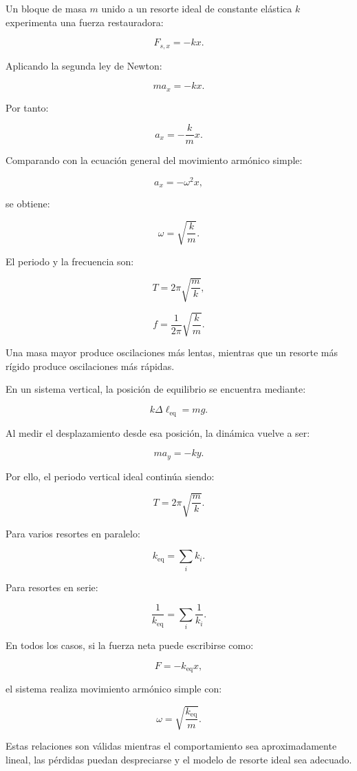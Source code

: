 \begin{resumen}
Un bloque de masa \(m\) unido a un resorte ideal de constante elástica \(k\) experimenta una fuerza restauradora:

\[ F_{s,x}=-kx. \]

Aplicando la segunda ley de Newton:

\[ ma_x=-kx. \]

Por tanto:

\[ \boxed{a_x=-\frac{k}{m}x}. \]

Comparando con la ecuación general del movimiento armónico simple:

\[ a_x=-\omega^2x, \]

se obtiene:

\[ \boxed{\omega=\sqrt{\frac{k}{m}}}. \]

El periodo y la frecuencia son:

\[ \boxed{T=2\pi\sqrt{\frac{m}{k}}}, \]

\[ \boxed{f=\frac{1}{2\pi}\sqrt{\frac{k}{m}}}. \]

Una masa mayor produce oscilaciones más lentas, mientras que un resorte más rígido produce oscilaciones más rápidas.

En un sistema vertical, la posición de equilibrio se encuentra mediante:

\[ \boxed{k\Delta\ell_{\mathrm{eq}}=mg}. \]

Al medir el desplazamiento desde esa posición, la dinámica vuelve a ser:

\[ ma_y=-ky. \]

Por ello, el periodo vertical ideal continúa siendo:

\[ \boxed{T=2\pi\sqrt{\frac{m}{k}}}. \]

Para varios resortes en paralelo:

\[ \boxed{k_{\mathrm{eq}}=\sum_i k_i}. \]

Para resortes en serie:

\[ \boxed{\frac{1}{k_{\mathrm{eq}}}=\sum_i\frac{1}{k_i}}. \]

En todos los casos, si la fuerza neta puede escribirse como:

\[ F=-k_{\mathrm{eq}}x, \]

el sistema realiza movimiento armónico simple con:

\[ \boxed{\omega=\sqrt{\frac{k_{\mathrm{eq}}}{m}}}. \]

Estas relaciones son válidas mientras el comportamiento sea aproximadamente lineal, las pérdidas puedan despreciarse y el modelo de resorte ideal sea adecuado.
\end{resumen}